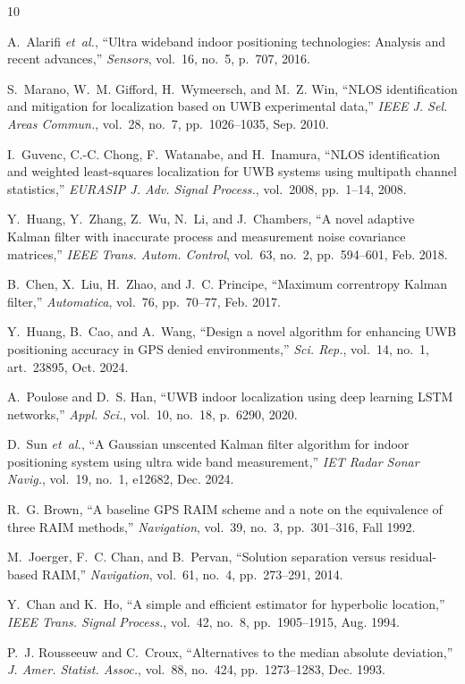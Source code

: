 \documentclass[journal]{IEEEtran}
\begin{document}
\begin{thebibliography}{10}

A.~Alarifi \emph{et~al.}, ``Ultra wideband indoor positioning technologies: Analysis and recent advances,'' \emph{Sensors}, vol.~16, no.~5, p.~707, 2016.

S.~Marano, W.~M. Gifford, H.~Wymeersch, and M.~Z. Win, ``NLOS identification and mitigation for localization based on UWB experimental data,'' \emph{IEEE J. Sel. Areas Commun.}, vol.~28, no.~7, pp.~1026--1035, Sep. 2010.

I.~Guvenc, C.-C. Chong, F.~Watanabe, and H.~Inamura, ``NLOS identification and weighted least-squares localization for UWB systems using multipath channel statistics,'' \emph{EURASIP J. Adv. Signal Process.}, vol.~2008, pp.~1--14, 2008.

Y.~Huang, Y.~Zhang, Z.~Wu, N.~Li, and J.~Chambers, ``A novel adaptive Kalman filter with inaccurate process and measurement noise covariance matrices,'' \emph{IEEE Trans. Autom. Control}, vol.~63, no.~2, pp.~594--601, Feb. 2018.

B.~Chen, X.~Liu, H.~Zhao, and J.~C. Principe, ``Maximum correntropy Kalman filter,'' \emph{Automatica}, vol.~76, pp.~70--77, Feb. 2017.

Y.~Huang, B.~Cao, and A.~Wang, ``Design a novel algorithm for enhancing UWB positioning accuracy in GPS denied environments,'' \emph{Sci. Rep.}, vol.~14, no.~1, art.~23895, Oct. 2024.

A.~Poulose and D.~S. Han, ``UWB indoor localization using deep learning LSTM networks,'' \emph{Appl. Sci.}, vol.~10, no.~18, p.~6290, 2020.

D.~Sun \emph{et~al.}, ``A Gaussian unscented Kalman filter algorithm for indoor positioning system using ultra wide band measurement,'' \emph{IET Radar Sonar Navig.}, vol.~19, no.~1, e12682, Dec. 2024.

R.~G. Brown, ``A baseline GPS RAIM scheme and a note on the equivalence of three RAIM methods,'' \emph{Navigation}, vol.~39, no.~3, pp.~301--316, Fall 1992.

M.~Joerger, F.~C. Chan, and B.~Pervan, ``Solution separation versus residual-based RAIM,'' \emph{Navigation}, vol.~61, no.~4, pp.~273--291, 2014.

Y.~Chan and K.~Ho, ``A simple and efficient estimator for hyperbolic location,'' \emph{IEEE Trans. Signal Process.}, vol.~42, no.~8, pp.~1905--1915, Aug. 1994.

P.~J. Rousseeuw and C.~Croux, ``Alternatives to the median absolute deviation,'' \emph{J. Amer. Statist. Assoc.}, vol.~88, no.~424, pp.~1273--1283, Dec. 1993.

\end{thebibliography}
\end{document}
